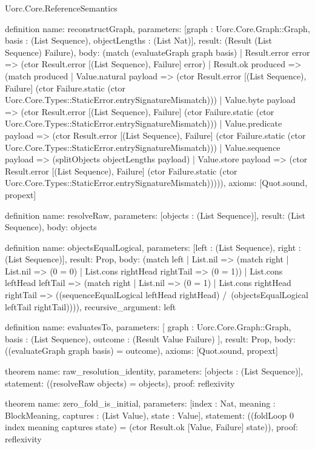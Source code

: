 \begin{lexlean}{Uorc.Core.ReferenceSemantics}
\begin{semanticmodule}
definition{
  name: reconstructGraph,
  parameters: [graph : Uorc.Core.Graph::Graph, basis : (List Sequence), objectLengths : (List Nat)],
  result: (Result (List Sequence) Failure),
  body: (match (evaluateGraph graph basis)
    | Result.error error => (ctor Result.error [(List Sequence), Failure] error)
    | Result.ok produced => (match produced
      | Value.natural payload => (ctor Result.error [(List Sequence), Failure] (ctor Failure.static (ctor Uorc.Core.Types::StaticError.entrySignatureMismatch)))
      | Value.byte payload => (ctor Result.error [(List Sequence), Failure] (ctor Failure.static (ctor Uorc.Core.Types::StaticError.entrySignatureMismatch)))
      | Value.predicate payload => (ctor Result.error [(List Sequence), Failure] (ctor Failure.static (ctor Uorc.Core.Types::StaticError.entrySignatureMismatch)))
      | Value.sequence payload => (splitObjects objectLengths payload)
      | Value.store payload => (ctor Result.error [(List Sequence), Failure] (ctor Failure.static (ctor Uorc.Core.Types::StaticError.entrySignatureMismatch))))),
  axioms: [Quot.sound, propext]
}

definition{
  name: resolveRaw,
  parameters: [objects : (List Sequence)],
  result: (List Sequence),
  body: objects
}

definition{
  name: objectsEqualLogical,
  parameters: [left : (List Sequence), right : (List Sequence)],
  result: Prop,
  body: (match left
    | List.nil => (match right | List.nil => (0 = 0) | List.cons rightHead rightTail => (0 = 1))
    | List.cons leftHead leftTail => (match right
      | List.nil => (0 = 1)
      | List.cons rightHead rightTail => ((sequenceEqualLogical leftHead rightHead) /\ (objectsEqualLogical leftTail rightTail)))),
  recursive_argument: left
}

definition{
  name: evaluatesTo,
  parameters: [
    graph : Uorc.Core.Graph::Graph,
    basis : (List Sequence),
    outcome : (Result Value Failure)
  ],
  result: Prop,
  body: ((evaluateGraph graph basis) = outcome),
  axioms: [Quot.sound, propext]
}

theorem{
  name: raw_resolution_identity,
  parameters: [objects : (List Sequence)],
  statement: ((resolveRaw objects) = objects),
  proof: reflexivity{}
}

theorem{
  name: zero_fold_is_initial,
  parameters: [index : Nat, meaning : BlockMeaning, captures : (List Value), state : Value],
  statement: ((foldLoop 0 index meaning captures state) = (ctor Result.ok [Value, Failure] state)),
  proof: reflexivity{}
}


\end{semanticmodule}
\end{lexlean}
